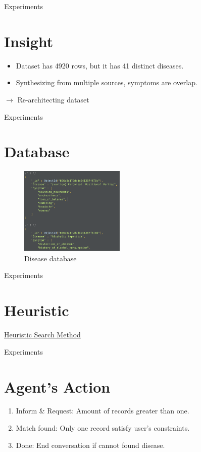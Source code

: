\documentclass[10pt]{beamer}
\begin{document}
\begin{frame}{Experiments}
    \section{Insight}
    \begin{itemize}
    	\item Dataset has 4920 rows, but it has 41 distinct diseases.
    	\item Synthesizing from multiple sources, symptoms are overlap.
    \end{itemize}
	$\rightarrow$ Re-architecting dataset
\end{frame}


\begin{frame}{Experiments}
    \section{Database}
    \begin{figure}[H]
    \centering
    \includegraphics[width=5cm]{image/dbms.png}
    \caption{Disease database}
    \label{fig:di_dbms}
    \end{figure}
\end{frame}

\begin{frame}{Experiments}
    \section{Heuristic}
    \begin{center}
    	\href{https://1drv.ms/u/s!AvgPPwEWTrewcyU0vohmLsytm_4?e=tFHl7o}{Heuristic Search Method}
   	\end{center}
	
\end{frame}



\begin{frame}{Experiments}
    \section{Agent's Action}
    \begin{enumerate}
        \item Inform \& Request: Amount of records greater than one.
        \item Match found: Only one record satisfy user's constraints.
        \item Done: End conversation if cannot found disease.
    \end{enumerate}
\end{frame}
\end{document}
